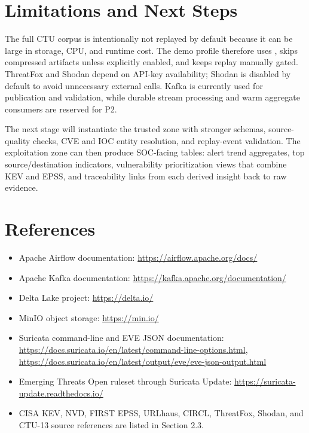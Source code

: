 \documentclass[11pt,a4paper]{article}
\newcommand{\code}[1]{\texttt{\detokenize{#1}}}
\begin{document}
\section{Limitations and Next Steps}

The full CTU corpus is intentionally not replayed by default because it can be large in storage, CPU, and runtime cost. The demo profile therefore uses \code{PCAP_REPLAY_MAX_ARTIFACTS=1}, skips compressed artifacts unless explicitly enabled, and keeps replay manually gated. ThreatFox and Shodan depend on API-key availability; Shodan is disabled by default to avoid unnecessary external calls. Kafka is currently used for publication and validation, while durable stream processing and warm aggregate consumers are reserved for P2.

The next stage will instantiate the trusted zone with stronger schemas, source-quality checks, CVE and IOC entity resolution, and replay-event validation. The exploitation zone can then produce SOC-facing tables: alert trend aggregates, top source/destination indicators, vulnerability prioritization views that combine KEV and EPSS, and traceability links from each derived insight back to raw evidence.

\section{References}

{\small
\begin{itemize}
  \item Apache Airflow documentation: \url{https://airflow.apache.org/docs/}
  \item Apache Kafka documentation: \url{https://kafka.apache.org/documentation/}
  \item Delta Lake project: \url{https://delta.io/}
  \item MinIO object storage: \url{https://min.io/}
  \item Suricata command-line and EVE JSON documentation: \url{https://docs.suricata.io/en/latest/command-line-options.html}, \url{https://docs.suricata.io/en/latest/output/eve/eve-json-output.html}
  \item Emerging Threats Open ruleset through Suricata Update: \url{https://suricata-update.readthedocs.io/}
  \item CISA KEV, NVD, FIRST EPSS, URLhaus, CIRCL, ThreatFox, Shodan, and CTU-13 source references are listed in Section 2.3.
\end{itemize}
}
\end{document}
